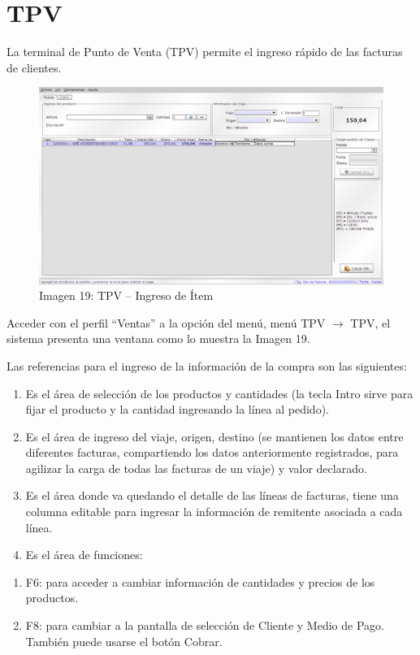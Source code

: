 \documentclass[letterpaper,10pt,spanish]{sphinxmanual}
\begin{document}
\section{TPV}
\label{ventas:tpv}
La terminal de Punto de Venta (TPV) permite el ingreso rápido de las facturas de clientes.
\begin{figure}[htbp]
\centering
\capstart

\includegraphics{ly_tpv_19.png}
\caption{Imagen 19: TPV – Ingreso de Ítem}\end{figure}

Acceder con el perfil ``Ventas'' a la opción del menú, menú TPV \(\rightarrow\)  TPV, el sistema presenta una ventana como lo muestra la Imagen 19.

Las referencias para el ingreso de la información de la compra son las siguientes:
\begin{enumerate}
\item {} 
Es el área de selección de los productos y cantidades (la tecla Intro sirve para fijar el producto y la cantidad ingresando la línea al pedido).

\item {} 
Es el área de ingreso del viaje, origen, destino (se mantienen los datos entre diferentes facturas, compartiendo los datos anteriormente registrados, para agilizar la carga de todas las facturas de un viaje) y valor declarado.

\item {} 
Es el área donde va quedando el detalle de las líneas de facturas, tiene una columna editable para ingresar la información de remitente asociada a cada línea.

\item {} 
Es el área de funciones:

\end{enumerate}
\begin{enumerate}
\item {} 
F6: para acceder a cambiar información de cantidades y precios de los productos.

\item {} 
F8: para cambiar a la pantalla de selección de Cliente y Medio de Pago. También puede usarse el botón Cobrar.

\end{enumerate}
\end{document}
